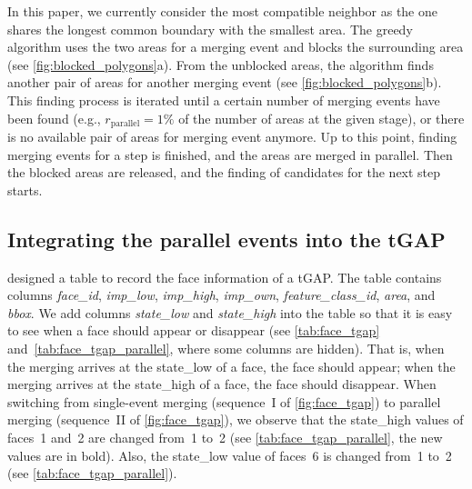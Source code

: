 \documentclass[ijgi,article,submit,moreauthors,pdftex]{Definitions/mdpi}
\begin{document}
In this paper, we currently consider the most compatible neighbor
as the one shares the longest common boundary with the smallest area.
The greedy algorithm uses the two areas for a merging event
and blocks the surrounding area (see \fig\ref{fig:blocked_polygons}a).
From the unblocked areas, the algorithm finds another pair of areas
for another merging event
(see \fig\ref{fig:blocked_polygons}b).
This finding process is iterated 
until a certain number of merging events have been found 
(e.g., $r_\mathrm{parallel} = 1\%$ of the number of areas at the given stage), 
or there is no available pair of areas for merging event anymore.
Up to this point, finding merging events for a step is finished,
and the areas are merged in parallel.
Then the blocked areas are released, 
and the finding of candidates for the next step starts.



%
%

\subsection{Integrating the parallel events into the tGAP}

\citet[\fig5.9b]{Meijers2011Thesis} designed a table 
to record the face information of a tGAP.
The table contains columns \emph{face\_id}, 
\emph{imp\_low}, \emph{imp\_high}, \emph{imp\_own},
\emph{feature\_class\_id}, \emph{area}, and \emph{bbox}.
We add columns \emph{state\_low} and \emph{state\_high} into the table 
so that it is easy to see when a face should appear or disappear 
(see \tbls\ref{tab:face_tgap} and~\ref{tab:face_tgap_parallel},
where some columns are hidden).
That is, when the merging arrives at the state\_low of a face,
the face should appear;
when the merging arrives at the state\_high of a face,
the face should disappear.
When switching from single-event merging 
(sequence~I of \fig\ref{fig:face_tgap})
to parallel merging (sequence~II of \fig\ref{fig:face_tgap}),
we observe that the state\_high values of faces~1 and~2 are changed from~1 to~2
(see \tbl\ref{tab:face_tgap_parallel}, the new values are in bold).
Also, the state\_low value of faces~6 is changed from~1 to~2
(see \tbl\ref{tab:face_tgap_parallel}).
\end{document}
